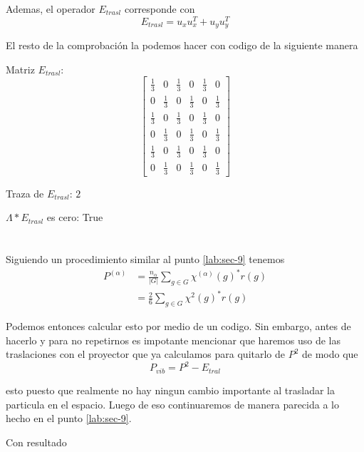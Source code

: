 \documentclass[12pt]{amsart}
\begin{document}
Ademas, el operador $E_{trasl}$ corresponde con
$$E_{trasl} = u_xu_x^T + u_yu_y^T$$

El resto de la comprobación la podemos hacer con codigo de la siguiente manera



Matriz $E_{trasl}$:
$$\left[\begin{matrix}\frac{1}{3} & 0 & \frac{1}{3} & 0 & \frac{1}{3} & 0\\0 & \frac{1}{3} & 0 & \frac{1}{3} & 0 & \frac{1}{3}\\\frac{1}{3} & 0 & \frac{1}{3} & 0 & \frac{1}{3} & 0\\0 & \frac{1}{3} & 0 & \frac{1}{3} & 0 & \frac{1}{3}\\\frac{1}{3} & 0 & \frac{1}{3} & 0 & \frac{1}{3} & 0\\0 & \frac{1}{3} & 0 & \frac{1}{3} & 0 & \frac{1}{3}\end{matrix}\right]$$

Traza de $E_{trasl}$: $2$

$\Lambda * E_{trasl}$ es cero: True

\section{}

Siguiendo un procedimiento similar al punto \ref{lab:sec-9} tenemos
\begin{align*}
  P^{(\alpha)} &= \frac{n_\alpha}{\left|G\right|} \sum_{g \in G} \chi^{(\alpha)}(g)^*r(g)\\
  &= \frac{2}{6} \sum_{g \in G} \chi^{2}(g)^*r(g)
\end{align*}

Podemos entonces calcular esto por medio de un codigo. Sin embargo, antes de hacerlo y para no repetirnos es impotante mencionar que haremos uso de las traslaciones con el proyector que ya calculamos para quitarlo de $P^2$ de modo que
$$P_{vib} = P^2 - E_{tral}$$

esto puesto que realmente no hay ningun cambio importante al trasladar la particula en el espacio. Luego de eso continuaremos de manera parecida a lo hecho en el punto \ref{lab:sec-9}.



Con resultado
\end{document}
